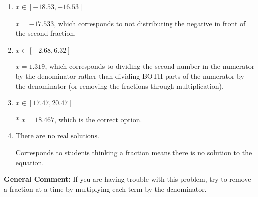 \documentclass{extbook}[14pt]
\begin{document}
\begin{enumerate}
{\begin{enumerate}[label=\Alph*.]
 $x = 140.000$, which corresponds to dividing the coefficients in front of x by the denominator rather than dividing BOTH parts of the numerator by the denominator (or removing the fractions through multiplication).
\item \( x \in [-18.53, -16.53] \)

 $x = -17.533$, which corresponds to not distributing the negative in front of the second fraction.
\item \( x \in [-2.68, 6.32] \)

 $x = 1.319$, which corresponds to dividing the second number in the numerator by the denominator rather than dividing BOTH parts of the numerator by the denominator (or removing the fractions through multiplication).
\item \( x \in [17.47, 20.47] \)

* $x = 18.467$, which is the correct option.
\item \( \text{There are no real solutions.} \)

Corresponds to students thinking a fraction means there is no solution to the equation.
\end{enumerate}

\textbf{General Comment:} If you are having trouble with this problem, try to remove a fraction at a time by multiplying each term by the denominator.
}
\end{enumerate}
\end{document}

